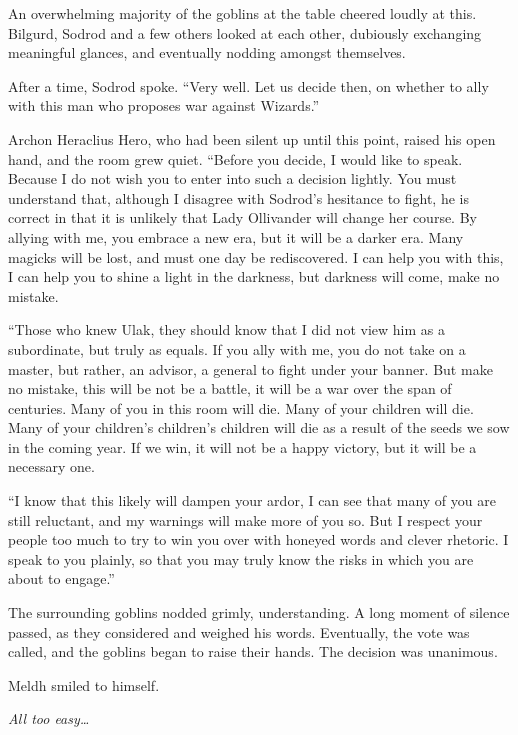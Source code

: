 An overwhelming majority of the goblins at the table cheered loudly at this. Bilgurd, Sodrod and a few others looked at each other, dubiously exchanging meaningful glances, and eventually nodding amongst themselves.

After a time, Sodrod spoke. “Very well. Let us decide then, on whether to ally with this man who proposes war against Wizards.”

Archon Heraclius Hero, who had been silent up until this point, raised his open hand, and the room grew quiet. “Before you decide, I would like to speak. Because I do not wish you to enter into such a decision lightly. You must understand that, although I disagree with Sodrod’s hesitance to fight, he is correct in that it is unlikely that Lady Ollivander will change her course. By allying with me, you embrace a new era, but it will be a darker era. Many magicks will be lost, and must one day be rediscovered. I can help you with this, I can help you to shine a light in the darkness, but darkness will come, make no mistake.

“Those who knew Ulak, they should know that I did not view him as a subordinate, but truly as equals. If you ally with me, you do not take on a master, but rather, an advisor, a general to fight under your banner. But make no mistake, this will be not be a battle, it will be a war over the span of centuries. Many of you in this room will die. Many of your children will die. Many of your children’s children’s children will die as a result of the seeds we sow in the coming year. If we win, it will not be a happy victory, but it will be a necessary one.

“I know that this likely will dampen your ardor, I can see that many of you are still reluctant, and my warnings will make more of you so. But I respect your people too much to try to win you over with honeyed words and clever rhetoric. I speak to you plainly, so that you may truly know the risks in which you are about to engage.”

The surrounding goblins nodded grimly, understanding. A long moment of silence passed, as they considered and weighed his words. Eventually, the vote was called, and the goblins began to raise their hands. The decision was unanimous.

Meldh smiled to himself.

\emph{All too easy…}